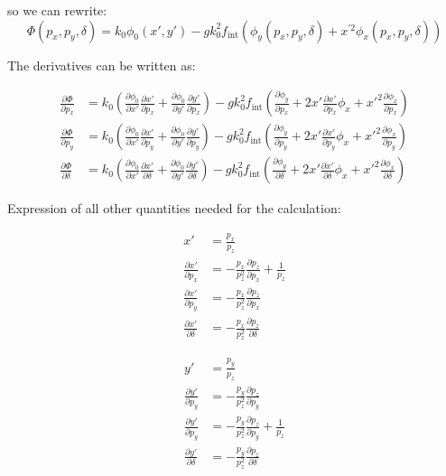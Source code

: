 so we can rewrite:
\begin{equation}
\Phi\left(p_x, p_y, \delta\right)=
k_0 \phi_0(x', y')
-g k_0^2 f_\text{int} \left(
\phi_y(p_x, p_y, \delta) +x^{\prime 2} \phi_x(p_x, p_y, \delta)
\right)
\end{equation}

The derivatives can be written as:

\begin{align}
\frac{\partial \Phi}{\partial p_x} &= 
k_0 \left( \frac{\partial \phi_0}{\partial x'}\frac{\partial x'}{\partial p_x} + \frac{\partial \phi_0}{\partial y'}\frac{\partial y'}{\partial p_x} \right)
-g k_0^2 f_\text{int} \left(
\frac{\partial \phi_y}{\partial p_x}
+ 2x'\frac{\partial x'}{\partial p_x}\phi_x
+x'^2 
\frac{\partial \phi_x}{\partial p_x}
\right)\\
%
\frac{\partial \Phi}{\partial p_y} &= 
k_0 \left( \frac{\partial \phi_0}{\partial x'}\frac{\partial x'}{\partial p_y} + \frac{\partial \phi_0}{\partial y'}\frac{\partial y'}{\partial p_y} \right)
-g k_0^2 f_\text{int} \left(
\frac{\partial \phi_y}{\partial p_y}
+ 2x'\frac{\partial x'}{\partial p_y}\phi_x
+x'^2 
\frac{\partial \phi_x}{\partial p_y}
\right)\\
%
\frac{\partial \Phi}{\partial \delta} &= 
k_0 \left( \frac{\partial \phi_0}{\partial x'}\frac{\partial x'}{\partial \delta} + \frac{\partial \phi_0}{\partial y'}\frac{\partial y'}{\partial \delta} \right)
-g k_0^2 f_\text{int} \left(
\frac{\partial \phi_y}{\partial \delta} 
+ 2x'\frac{\partial x'}{\partial \delta}\phi_x
+x'^2 
\frac{\partial \phi_x}{\partial \delta} 
\right)
\end{align}

Expression of all other quantities needed for the calculation:


\begin{align}
x' &= \frac{p_x}{p_z}\\
\frac{\partial x'}{\partial p_x} &= - \frac{p_x}{p_z^2}\frac{\partial p_z}{\partial p_x} + \frac{1}{p_z} \\
\frac{\partial x'}{\partial p_y} &= - \frac{p_x}{p_z^2}\frac{\partial p_z}{\partial p_x}\\
\frac{\partial x'}{\partial \delta} &= - \frac{p_x}{p_z^2}\frac{\partial p_z}{\partial \delta}
\end{align}

\begin{align}
y' &= \frac{p_y}{p_z}\\
\frac{\partial y'}{\partial p_y} &= - \frac{p_y}{p_z^2}\frac{\partial p_z}{\partial p_y}  \\
\frac{\partial y'}{\partial p_y} &= - \frac{p_y}{p_z^2}\frac{\partial p_z}{\partial p_y} + \frac{1}{p_z}\\
\frac{\partial y'}{\partial \delta} &= - \frac{p_y}{p_z^2}\frac{\partial p_z}{\partial \delta}
\end{align}


